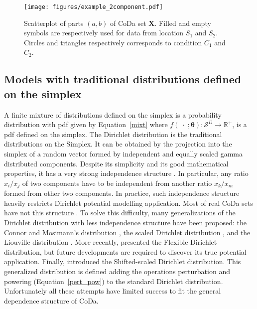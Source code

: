 \documentclass[12pt, a4paper]{article}
\newcommand{\m}[1]{\boldsymbol{#1}}
\begin{document}
\begin{figure}[thbp]
\centering
\texttt{[image: figures/example\_2component.pdf]}
\caption{Scatterplot of parts $(a,b)$ of CoDa set $\mathbf{X}$. Filled and empty symbols are respectively used for
data from location $S_1$ and $S_2$. Circles and triangles respectively corresponds to condition
$C_1$ and $C_2$.}\label{example_elim_2_components}
\end{figure}

\subsection{Models with traditional distributions defined on the simplex}
\label{simplex_section}

\noindent A finite mixture of distributions defined on the simplex is a probability distribution with pdf given by Equation~\ref{mixt} where $f(\;\cdot\;;\m\theta): \mathcal{S}^D \rightarrow \mathbb{R}^+$, is a pdf defined on the simplex. The Dirichlet distribution is the traditional distributions on the Simplex. It can be obtained by the projection into the simplex of a random vector formed by independent and equally scaled gamma distributed components. 
Despite its simplicity and its good mathematical properties, it has a very strong independence structure \citep{aitchison1986statistical}. In particular, any ratio $x_i/x_j$ of two components have to be independent from another
ratio $x_k/x_m$ formed from other two components. In practice, such independence structure heavily restricts Dirichlet potential modelling application. Most of real CoDa sets have not this structure \citep{aitchison1986statistical}. To solve this difficulty, many generalizations of the Dirichlet distribution with less independence structure have been proposed: the Connor and Mosimann's distribution
\citep{connor1969concepts}, the scaled Dirichlet distribution \citep{aitchison1986statistical},  and the Liouville distribution \citep{rayens1994dependence}.  More recently, \cite{ongaro2008new} presented the Flexible Dirichlet distribution, but future
developments are required to discover its true potential application. Finally, \cite{monti2011shifted} introduced the Shifted-scaled Dirichlet distribution. This generalized distribution is defined adding the operations
perturbation and powering (Equation~\ref{pert_pow}) to the standard Dirichlet distribution. Unfortunately all these attempts
have limited success to fit the general dependence structure of CoDa.
\end{document}
